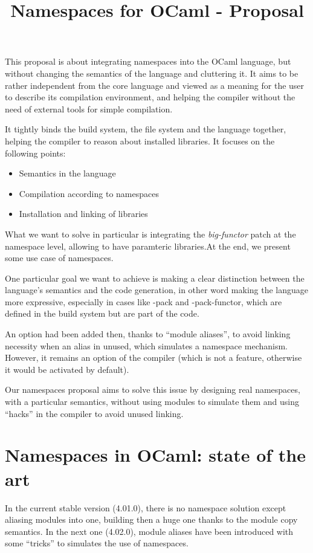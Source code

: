 \documentclass[11pt,a4paper]{article}
\title{Namespaces for OCaml - Proposal}
\begin{document}
\maketitle

This proposal is about integrating namespaces into the OCaml language, but
without changing the semantics of the language and cluttering it. It aims to be
rather independent from the core language and viewed as a meaning for the user to
describe its compilation environment, and helping the compiler without the need
of external tools for simple compilation.

It tightly binds the build system, the file system and the language together,
helping the compiler to reason about installed libraries.
It focuses on the following points:
\begin{itemize}
\item Semantics in the language
\item Compilation according to namespaces
\item Installation and linking of libraries
\end{itemize}

What we want to solve in particular is integrating the \emph{big-functor} patch
at the namespace level, allowing to have paramteric libraries.At the end, we
present some use case of namespaces.

One particular goal we want to achieve is making a clear distinction between the
language's semantics and the code generation, in other word making the language
more expressive, especially in cases like -pack and -pack-functor, which are
defined in the build system but are part of the code.

An option had been added then, thanks to ``module aliases'', to avoid linking
necessity when an alias in unused, which simulates a namespace
mechanism. However, it remains an option of the compiler (which is not a
feature, otherwise it would be activated by default).

Our namespaces proposal aims to solve this issue by designing real namespaces,
with a particular semantics, without using modules to simulate them and using
``hacks'' in the compiler to avoid unused linking.

\section{Namespaces in OCaml: state of the art}

In the current stable version (4.01.0), there is no namespace solution except
aliasing modules into one, building then a huge one thanks to the module copy
semantics. In the next one (4.02.0), module aliases have been introduced with
some ``tricks'' to simulates the use of namespaces.
\end{document}
